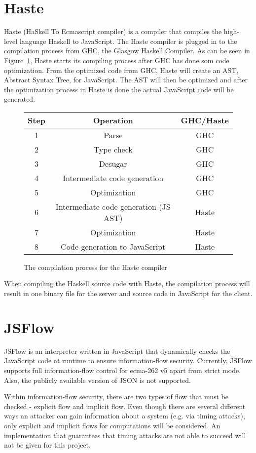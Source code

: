 \section{Haste}
Haste (HaSkell To Ecmascript compiler) is a compiler that compiles the high-level language Haskell to JavaScript. The Haste compiler is plugged in to the compilation process from GHC, the Glasgow Haskell Compiler. As can be seen in Figure~\ref{fig:system}, Haste starts its compiling process after GHC has done som code optimization. From the optimized code from GHC, Haste will create an AST, Abstract Syntax Tree, for JavaScript. The AST will then be optimized and after the optimization process in Haste is done the actual JavaScript code will be generated.
\begin{figure}[h]
  \begin{tabular}{|c|c|c|}
    \hline
    Step & Operation & GHC/Haste \\
    \hline
    1 & Parse & GHC \\
    2 & Type check & GHC \\
    3 & Desugar & GHC \\
    4 & Intermediate code generation & GHC \\
    5 & Optimization & GHC \\
    6 & Intermediate code generation (JS AST) & Haste \\
    7 & Optimization & Haste \\
    8 & Code generation to JavaScript & Haste \\
    \hline
  \end{tabular}
  \caption{The compilation process for the Haste compiler}
  \label{fig:system}
\end{figure}

When compiling the Haskell source code with Haste, the compilation process will result in one binary file for the server and source code in JavaScript for the client.\cite{haste-symposium}

\section{JSFlow}
JSFlow is an interpreter written in JavaScript that dynamically checks the JavaScript code at runtime to ensure information-flow security. Currently, JSFlow supports full information-flow control for ecma-262 v5 apart from strict mode. Also, the publicly available version of JSON is not supported.

Within information-flow security, there are two types of flow that must be checked - explicit flow and implicit flow. Even though there are several different ways an attacker can gain information about a system (e.g. via timing attacks), only explicit and implicit flows for computations will be considered. An implementation that guarantees that timing attacks are not able to succeed will not be given for this project.
